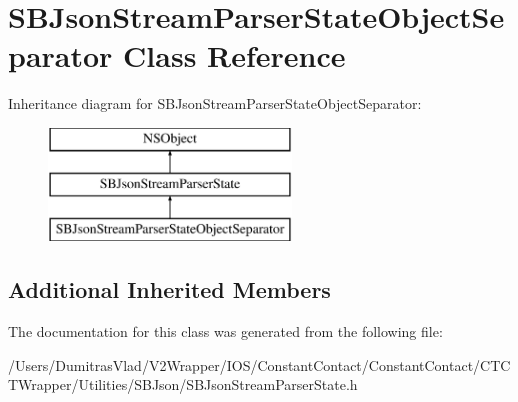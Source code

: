 \hypertarget{interface_s_b_json_stream_parser_state_object_separator}{\section{S\-B\-Json\-Stream\-Parser\-State\-Object\-Separator Class Reference}
\label{interface_s_b_json_stream_parser_state_object_separator}
}
Inheritance diagram for S\-B\-Json\-Stream\-Parser\-State\-Object\-Separator\-:\begin{figure}[H]
\begin{center}
\leavevmode
\includegraphics[height=3.000000cm]{interface_s_b_json_stream_parser_state_object_separator}
\end{center}
\end{figure}
\subsection*{Additional Inherited Members}


The documentation for this class was generated from the following file\-:\begin{DoxyCompactItemize}
\item 
/\-Users/\-Dumitras\-Vlad/\-V2\-Wrapper/\-I\-O\-S/\-Constant\-Contact/\-Constant\-Contact/\-C\-T\-C\-T\-Wrapper/\-Utilities/\-S\-B\-Json/S\-B\-Json\-Stream\-Parser\-State.\-h\end{DoxyCompactItemize}
